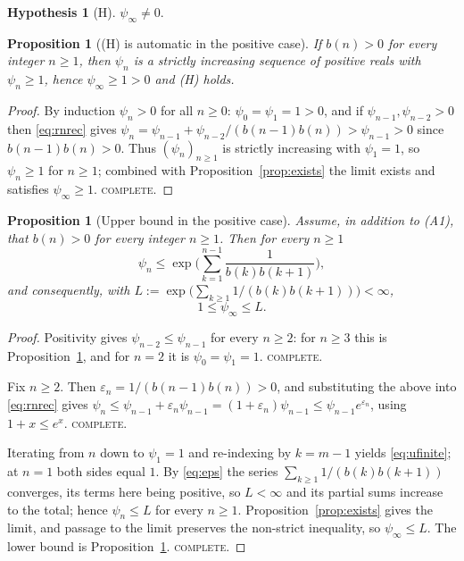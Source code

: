 \documentclass[11pt]{article}
\newtheorem{proposition}[theorem]{Proposition}
\theoremstyle{definition}
\newtheorem{hypothesis}[theorem]{Hypothesis}
\newcommand{\psiinf}{\psi_\infty}
\begin{document}
\begin{hypothesis}[H]\label{hyp:H}
$\psiinf\neq0$.
\end{hypothesis}

\begin{proposition}[(H) is automatic in the positive case]\label{prop:positive}
If $b(n)>0$ for every integer $n\ge1$, then $\psi_n$ is a strictly increasing
sequence of positive reals with $\psi_n\ge1$, hence $\psiinf\ge1>0$ and
\textup{(H)} holds.
\end{proposition}

\begin{proof}
By induction $\psi_n>0$ for all $n\ge0$: $\psi_0=\psi_1=1>0$, and if
$\psi_{n-1},\psi_{n-2}>0$ then \eqref{eq:rnrec} gives
$\psi_n=\psi_{n-1}+\psi_{n-2}/(b(n-1)b(n))>\psi_{n-1}>0$ since $b(n-1)b(n)>0$.
Thus $(\psi_n)_{n\ge1}$ is strictly increasing with $\psi_1=1$, so $\psi_n\ge1$ for
$n\ge1$; combined with Proposition~\ref{prop:exists} the limit exists and
satisfies $\psiinf\ge1$. \textsc{complete.}
\end{proof}

\begin{proposition}[Upper bound in the positive case]\label{prop:upper}
Assume, in addition to \textup{(A1)}, that $b(n)>0$ for every integer $n\ge1$.
Then for every $n\ge1$
\begin{equation}\label{eq:ufinite}
\psi_n\le\exp\Big(\sum_{k=1}^{n-1}\frac{1}{b(k)b(k+1)}\Big),
\end{equation}
and consequently, with
$L:=\exp\big(\sum_{k\ge1}1/(b(k)b(k+1))\big)<\infty$,
\begin{equation}\label{eq:ulimit}
1\le\psiinf\le L .
\end{equation}
\end{proposition}

\begin{proof}
Positivity gives $\psi_{n-2}\le \psi_{n-1}$ for every $n\ge2$: for $n\ge3$ this is
Proposition~\ref{prop:positive}, and for $n=2$ it is $\psi_0=\psi_1=1$.
\textsc{complete.}

Fix $n\ge2$. Then $\varepsilon_n=1/(b(n-1)b(n))>0$, and substituting the above
into \eqref{eq:rnrec} gives
$\psi_n\le \psi_{n-1}+\varepsilon_n \psi_{n-1}=(1+\varepsilon_n)\psi_{n-1}
\le \psi_{n-1}e^{\varepsilon_n}$, using $1+x\le e^x$. \textsc{complete.}

Iterating from $n$ down to $\psi_1=1$ and re-indexing by $k=m-1$ yields
\eqref{eq:ufinite}; at $n=1$ both sides equal $1$. By \eqref{eq:eps} the series
$\sum_{k\ge1}1/(b(k)b(k+1))$ converges, its terms here being positive, so
$L<\infty$ and its partial sums increase to the total; hence $\psi_n\le L$ for
every $n\ge1$. Proposition~\ref{prop:exists} gives the limit, and passage to
the limit preserves the non-strict inequality, so $\psiinf\le L$. The lower bound
is Proposition~\ref{prop:positive}. \textsc{complete.}
\end{proof}
\end{document}
